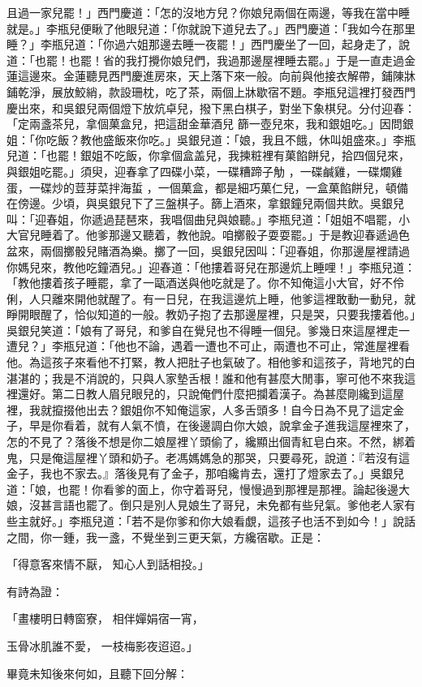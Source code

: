 \begin{showcontents}{}
且過一家兒罷！」西門慶道：「怎的沒地方兒？你娘兒兩個在兩邊，等我在當中睡就是。」李瓶兒便瞅了他眼兒道：「你就說下道兒去了。」西門慶道：「我如今在那里睡？」李瓶兒道：「你過六姐那邊去睡一夜罷！」西門慶坐了一回，起身走了，說道：「也罷！也罷！省的我打攪你娘兒們，我過那邊屋裡睡去罷。」于是一直走過金蓮這邊來。金蓮聽見西門慶進房來，天上落下來一般。向前與他接衣解帶，鋪陳牀鋪乾淨，展放鮫綃，款設珊枕，吃了茶，兩個上牀歇宿不題。李瓶兒這裡打發西門慶出來，和吳銀兒兩個燈下放炕卓兒，撥下黑白棋子，對坐下象棋兒。分付迎春：「定兩盞茶兒，拿個菓盒兒，把這甜金華酒兒 篩一壺兒來，我和銀姐吃。」因問銀姐：「你吃飯？教他盛飯來你吃。」吳銀兒道：「娘，我且不餓，休叫姐盛來。」李瓶兒道：「也罷！銀姐不吃飯，你拿個盒盖兒，我揀粧裡有菓餡餅兒，拾四個兒來，與銀姐吃罷。」須臾，迎春拿了四碟小菜，一碟糟蹄子觔 ，一碟鹹雞，一碟爛雞蛋，一碟炒的荳芽菜拌海蜇 ，一個菓盒，都是細巧菓仁兒，一盒菓餡餅兒，頓備在傍邊。少頃，與吳銀兒下了三盤棋子。篩上酒來，拿銀鐘兒兩個共飲。吳銀兒叫：「迎春姐，你遞過琵琶來，我唱個曲兒與娘聽。」李瓶兒道：「姐姐不唱罷，小大官兒睡着了。他爹那邊又聽着，教他說。咱擲骰子耍耍罷。」于是教迎春遞過色盆來，兩個擲骰兒賭酒為樂。擲了一回，吳銀兒因叫：「迎春姐，你那邊屋裡請過你媽兒來，教他吃鐘酒兒。」迎春道：「他摟着哥兒在那邊炕上睡哩！」李瓶兒道：「教他摟着孩子睡罷，拿了一甌酒送與他吃就是了。你不知俺這小大官，好不伶俐，人只離來開他就醒了。有一日兒，在我這邊炕上睡，他爹這裡敢動一動兒，就睜開眼醒了，恰似知道的一般。教奶子抱了去那邊屋裡，只是哭，只要我摟着他。」吳銀兒笑道：「娘有了哥兒，和爹自在覺兒也不得睡一個兒。爹幾日來這屋裡走一遭兒？」李瓶兒道：「他也不論，遇着一遭也不可止，兩遭也不可止，常進屋裡看他。為這孩子來看他不打緊，教人把肚子也氣破了。相他爹和這孩子，背地咒的白湛湛的；我是不消說的，只與人家墊舌根！誰和他有甚麼大閒事，寧可他不來我這裡還好。第二日教人眉兒眼兒的，只說俺們什麼把攔着漢子。為甚麼剛纔到這屋裡，我就攛掇他出去？銀姐你不知俺這家，人多舌頭多！自今日為不見了這定金子，早是你看着，就有人氣不憤，在後邊調白你大娘，說拿金子進我這屋裡來了，怎的不見了？落後不想是你二娘屋裡丫頭偷了，纔顯出個青紅皂白來。不然，綁着鬼，只是俺這屋裡丫頭和奶子。老馮媽媽急的那哭，只要尋死，說道：『若沒有這金子，我也不家去。』落後見有了金子，那咱纔肯去，還打了燈家去了。」吳銀兒道：「娘，也罷！你看爹的面上，你守着哥兒，慢慢過到那裡是那裡。論起後邊大娘，沒甚言語也罷了。倒只是別人見娘生了哥兒，未免都有些兒氣。爹他老人家有些主就好。」李瓶兒道：「若不是你爹和你大娘看覷，這孩子也活不到如今！」說話之間，你一鍾，我一盞，不覺坐到三更天氣，方纔宿歇。正是：

「得意客來情不厭，  知心人到話相投。」

有詩為證：

「畫樓明日轉窗寮，  相伴嬋娟宿一宵，

玉骨冰肌誰不愛，  一枝梅影夜迢迢。」

畢竟未知後來何如，且聽下回分解：




\end{showcontents}



